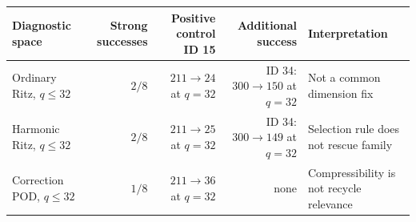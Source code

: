 \begin{tabularx}{\textwidth}{XrrrX}
\toprule
Diagnostic space & Strong successes & Positive control ID 15 & Additional success & Interpretation \\
\midrule
Ordinary Ritz, $q\le32$ & $2/8$ & $211\to24$ at $q=32$ & ID 34: $300\to150$ at $q=32$ & Not a common dimension fix \\
Harmonic Ritz, $q\le32$ & $2/8$ & $211\to25$ at $q=32$ & ID 34: $300\to149$ at $q=32$ & Selection rule does not rescue family \\
Correction POD, $q\le32$ & $1/8$ & $211\to36$ at $q=32$ & none & Compressibility is not recycle relevance \\
\bottomrule
\end{tabularx}
